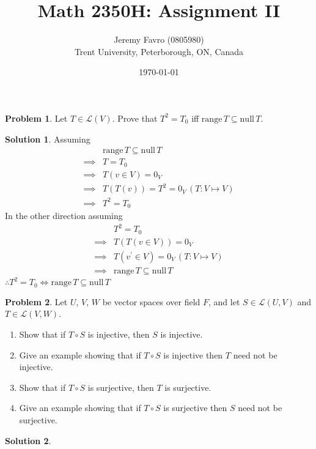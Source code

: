 \documentclass[10pt]{article}
\title{Math 2350H: Assignment II}
\author{Jeremy Favro (0805980) \\ Trent University, Peterborough, ON, Canada}
\date{\today}
\theoremstyle{definition}
\newtheorem{problem}{Problem}
\newtheorem{soln}{Solution}
\begin{document}
\maketitle

\begin{problem}
Let $T\in\mathcal{L}(V)$. Prove that $T^2=T_0$ iff $\mathrm{range}\,T\subseteq\mathrm{null}\,T$.
\end{problem}
\begin{soln}
  Assuming
  \begin{align*}
             & \mathrm{range}\,T\subseteq\mathrm{null}\,T \\
    \implies & T=T_0                                      \\
    \implies & T(v\in V)=0_V                              \\
    \implies & T(T(v))=T^2=0_V\, (T:V\mapsto V)               \\
    \implies & T^2=T_0
  \end{align*}
  In the other direction assuming
  \begin{align*}
             & T^2=T_0          \\
    \implies & T(T(v\in V))=0_V \\
    \implies & T(v^\prime \in V)=0_V \, (T:V\mapsto V)\\
    \implies & \mathrm{range}\,T\subseteq\mathrm{null}\,T
  \end{align*}
  $\therefore T^2=T_0\iff \mathrm{range}\,T\subseteq\mathrm{null}\,T$
\end{soln}

\begin{problem}
Let $U$, $V$, $W$ be vector spaces over field $F$, and let $S\in\mathcal{L}(U,V)$ and $T\in\mathcal{L}(V,W)$.
\begin{enumerate}[label=(\alph*)]
  \item Show that if $T\circ S$ is injective, then $S$ is injective.
  \item Give an example showing that if $T\circ S$ is injective then $T$ need not be injective.
  \item Show that if $T\circ S$ is surjective, then $T$ is surjective.
  \item Give an example showing that if $T\circ S$ is surjective then $S$ need not be surjective.
\end{enumerate}
\end{problem}
\begin{soln}

\end{soln}
\end{document}
